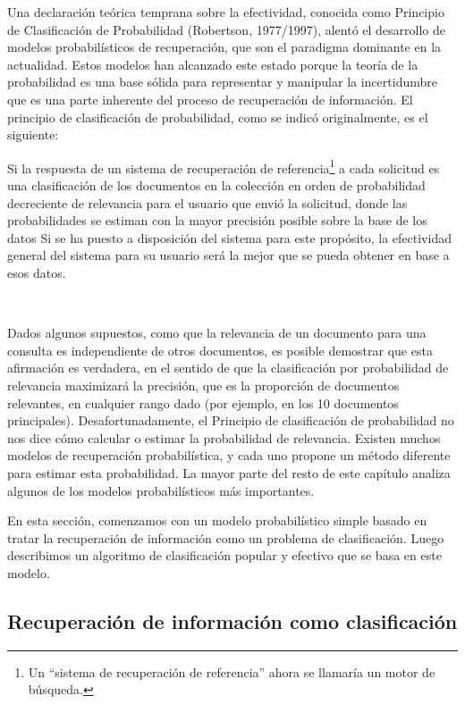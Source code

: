 Una declaración teórica temprana sobre la efectividad, conocida como Principio de Clasificación de Probabilidad (Robertson, 1977/1997), alentó el desarrollo de modelos probabilísticos de recuperación, que son el paradigma dominante en la actualidad. Estos modelos han alcanzado este estado porque la teoría de la probabilidad es una base sólida para representar y manipular la incertidumbre que es una parte inherente del proceso de recuperación de información. El principio de clasificación de probabilidad, como se indicó originalmente, es el siguiente:

\begin{center}
	\begin{minipage}{13cm}	
		Si la respuesta de un sistema de recuperación de referencia\footnote{Un ``sistema de recuperación de referencia'' ahora se llamaría un motor de búsqueda.} a cada solicitud es una clasificación de los documentos en la colección en orden de probabilidad decreciente de relevancia para el usuario que envió la solicitud, donde las probabilidades se estiman con la mayor precisión posible sobre la base de los datos Si se ha puesto a disposición del sistema para este propósito, la efectividad general del sistema para su usuario será la mejor que se pueda obtener en base a esos datos.
	\end{minipage}\\
\end{center}

Dados algunos supuestos, como que la relevancia de un documento para una consulta es independiente de otros documentos, es posible demostrar que esta afirmación es verdadera, en el sentido de que la clasificación por probabilidad de relevancia maximizará la precisión, que es la proporción de documentos relevantes, en cualquier rango dado (por ejemplo, en los 10 documentos principales). Desafortunadamente, el Principio de clasificación de probabilidad no nos dice cómo calcular o estimar la probabilidad de relevancia. Existen muchos modelos de recuperación probabilística, y cada uno propone un método diferente para estimar esta probabilidad. La mayor parte del resto de este capítulo analiza algunos de los modelos probabilísticos más importantes.

En esta sección, comenzamos con un modelo probabilístico simple basado en tratar la recuperación de información como un problema de clasificación. Luego describimos un algoritmo de clasificación popular y efectivo que se basa en este modelo.

\subsection{Recuperación de información como clasificación}

